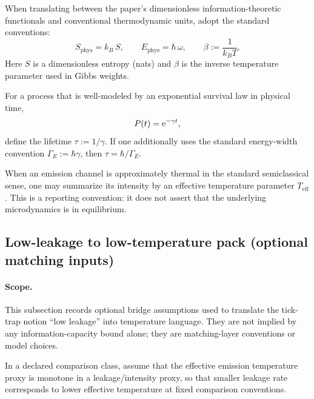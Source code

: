 \begin{assumption}
\label{ass:pdr_entropy_energy_temperature_units}
\MatchTag When translating between the paper's dimensionless information-theoretic functionals and conventional thermodynamic units, adopt the standard conventions:
\[
S_{\mathrm{phys}}=k_B\,S,
\qquad
E_{\mathrm{phys}}=\hbar\,\omega,
\qquad
\beta:=\frac{1}{k_B T}.
\]
Here $S$ is a dimensionless entropy (nats) and $\beta$ is the inverse temperature parameter used in Gibbs weights.
\end{assumption}

\begin{assumption}
\label{ass:pdr_lifetime_width}
\MatchTag For a process that is well-modeled by an exponential survival law in physical time,
\[
P(t)=\mathrm{e}^{-\gamma t},
\]
define the lifetime $\tau:=1/\gamma$.
If one additionally uses the standard energy-width convention $\Gamma_E:=\hbar \gamma$, then $\tau=\hbar/\Gamma_E$.
\end{assumption}

\begin{assumption}
\label{ass:pdr_thermal_proxy}
\MatchTag When an emission channel is approximately thermal in the standard semiclassical sense, one may summarize its intensity by an effective temperature parameter $T_{\mathrm{eff}}$.
This is a reporting convention: it does not assert that the underlying microdynamics is in equilibrium.
\end{assumption}

\subsection{Low-leakage to low-temperature pack (optional matching inputs)}
\label{subsec:pphys_low_leakage_pack}

\paragraph{Scope.}
\AuditTag This subsection records optional bridge assumptions used to translate the tick-trap notion ``low leakage'' into temperature language.
They are not implied by any information-capacity bound alone; they are matching-layer conventions or model choices.

\begin{assumption}
\label{ass:ppl_low_leakage_low_temp}
\MatchTag In a declared comparison class, assume that the effective emission temperature proxy is monotone in a leakage/intensity proxy, so that smaller leakage rate corresponds to lower effective temperature at fixed comparison conventions.
\end{assumption}


